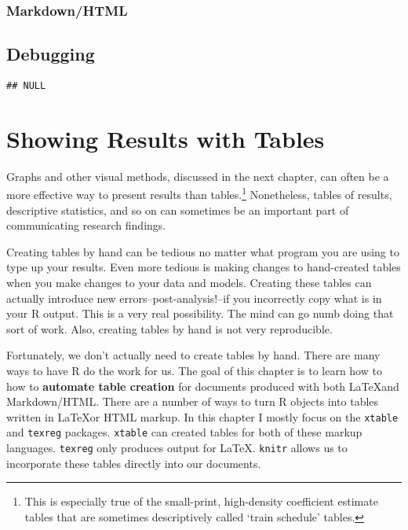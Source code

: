 \documentclass[ChapterTOCs,krantz1]{krantz}\usepackage{graphicx, color}
\makeatletter
\newenvironment{kframe}{%
 \def\at@end@of@kframe{}%
 \ifinner\ifhmode%
  \def\at@end@of@kframe{\end{minipage}}%
  \begin{minipage}{\columnwidth}%
 \fi\fi%
 \def\FrameCommand##1{\hskip\@totalleftmargin \hskip-\fboxsep
 \colorbox{shadecolor}{##1}\hskip-\fboxsep
     \hskip-\linewidth \hskip-\@totalleftmargin \hskip\columnwidth}%
 \MakeFramed {\advance\hsize-\width
   \@totalleftmargin\z@ \linewidth\hsize
   \@setminipage}}%
 {\par\unskip\endMakeFramed%
 \at@end@of@kframe}
\newenvironment{knitrout}{}{} %
\makeatother
\begin{document}
\subsection{Markdown/HTML}

\section{Debugging}


\begin{knitrout}
\color{fgcolor}\begin{kframe}
\begin{verbatim}
## NULL
\end{verbatim}
\end{kframe}
\end{knitrout}


\chapter{Showing Results with Tables}

Graphs and other visual methods, discussed in the next chapter, can
often be a more effective way to present results than tables.\footnote{This
  is especially true of the small-print, high-density coefficient
  estimate tables that are sometimes descriptively called `train
  schedule' tables.} Nonetheless, tables of results, descriptive statistics,
and so on can sometimes be an important part of communicating
research findings.

Creating tables by hand can be tedious no matter what program you are
using to type up your results. Even more tedious is making changes to
hand-created tables when you make changes to your data and models.
Creating these tables can actually introduce new
errors--post-analysis!--if you incorrectly copy what is in your
R output. This is a very real possibility. The mind can go numb
doing that sort of work. Also, creating tables by hand is not very
reproducible.

Fortunately, we don't actually need to create tables by hand. There are
many ways to have R do the work for us. The goal of this
chapter is to learn how to how to \textbf{automate table creation} for
documents produced with both \LaTeX and Markdown/HTML. There are a
number of ways to turn R objects into tables written in
\LaTeX or HTML markup. In this chapter I mostly focus on the
\texttt{xtable} and \texttt{texreg} packages. \texttt{xtable} can
created tables for both of these markup languages. \texttt{texreg} only
produces output for \LaTeX. \texttt{knitr} allows us to incorporate
these tables directly into our documents.
\end{document}
